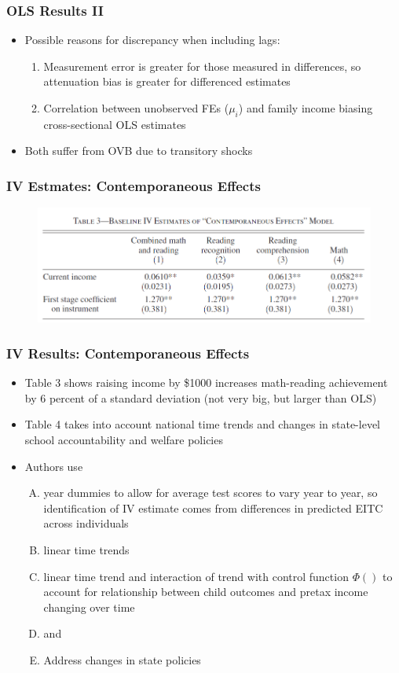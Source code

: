 \documentclass{beamer}
\begin{document}
\begin{frame}
\frametitle{OLS Results II}
	\begin{itemize}
		\item Possible reasons for discrepancy when including lags:
		\begin{enumerate}[(1)]
			\item Measurement error is greater for those measured in differences, so attenuation bias is greater for differenced estimates
			\item Correlation between unobserved FEs ($\mu_i$) and family income biasing cross-sectional OLS estimates 
		\end{enumerate}
		\item Both suffer from OVB due to transitory shocks
	\end{itemize}
\end{frame}

\begin{frame}
\frametitle{IV Estmates: Contemporaneous Effects}
	\begin{figure}
		\includegraphics[scale=0.45]{../Tables/table2.png}
	\end{figure}
\end{frame}

\begin{frame}
\frametitle{IV Results: Contemporaneous Effects}
\begin{itemize}
	\item Table 3 shows raising income by \$1000 increases math-reading achievement by 6 percent of a standard deviation (not very big, but larger than OLS)
	\item Table 4 takes into account national time trends and changes in state-level school accountability and welfare policies
	\item Authors use 
	\begin{enumerate}[A.]
		\item year dummies to allow for average test scores to vary year to year, so identification of IV estimate comes from differences in predicted EITC across individuals
		\item linear time trends
		\item linear time trend and interaction of trend with control function $\Phi()$ to account for relationship between child outcomes and pretax income changing over time
		\item  and 
		\item Address changes in state policies
	\end{enumerate} 
\end{itemize}
\end{frame}
\end{document}
